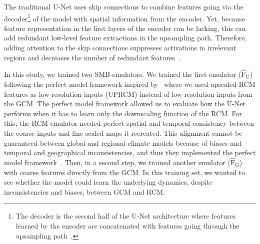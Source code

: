 \documentclass[a4paper,11pt,oneside]{report}
\begin{document}
\begin{itemize}
    The traditional U-Net uses skip connections to combine features going via the decoder\footnote{The decoder is the second half of the U-Net architecture where features learned by the encoder are concatenated with features going through the upsampling path~\cite{encoder}.} of the model with spatial information from the encoder. Yet, because feature representation in the first layers of the encoder can be lacking, this can add redundant low-level feature extractions in the upsampling path. Therefore, adding attention to the skip connections suppresses activations in irrelevant regions and decreases the number of redundant features~\cite{AttentionUNet}.
    
    In this study, we trained two SMB-emulators. We trained the first emulator ($\operatorname{\mathrm{\hat{F}_U}}$) following the perfect model framework inspired by~\cite{Doury} where we used upscaled RCM features as low-resolution inputs (UPRCM) instead of low-resolution inputs from the GCM. The perfect model framework allowed us to evaluate how the U-Net performs when it has to learn only the downscaling function of the RCM. For this, the RCM-emulator needed perfect spatial and temporal consistency between the coarse inputs and fine-scaled maps it recreated. This alignment cannot be guaranteed between global and regional climate models because of biases and temporal and geographical inconsistencies, and thus they implemented the perfect model framework~\cite{Doury, Sanchez2009, Sanchez2018}. Then, in a second step, we trained another emulator ($\operatorname{\mathrm{\hat{F}_G}}$) with coarse features directly from the GCM. In this training set, we wanted to see whether the model could learn the underlying dynamics, despite inconsistencies and biases, between GCM and RCM. 
    
    

    

\end{itemize}
\end{document}

